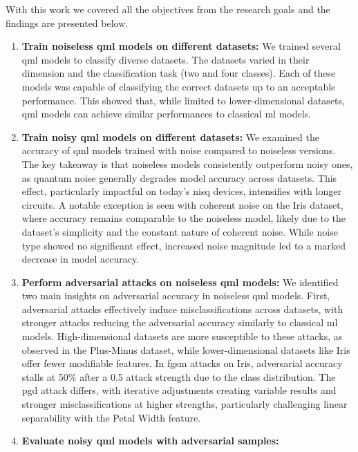 With this work we covered all the objectives from the research
goals and the findings are presented below. \

\begin{enumerate}
    \item \textbf{Train noiseless \ac{qml} models on different datasets:}
        We trained several \ac{qml} models to classify diverse datasets.
        The datasets varied in their dimension and the classification
        task (two and four classes). Each of these models was capable of
        classifying the correct datasets up to an acceptable performance.
        This showed that, while limited to lower-dimensional datasets,
        \ac{qml} models can achieve similar performances to classical
        \ac{ml} models. \
    \item \textbf{Train noisy \ac{qml} models on different datasets:}
        We examined the accuracy of \ac{qml} models trained
        with noise compared to noiseless versions. The key takeaway is
        that noiseless models consistently outperform noisy ones, as
        quantum noise generally degrades model accuracy across datasets.
        This effect, particularly impactful on today's \ac{nisq} devices,
        intensifies with longer circuits. A notable exception is seen with
        coherent noise on the Iris dataset, where accuracy remains comparable
        to the noiseless model, likely due to the dataset's simplicity and the
        constant nature of coherent noise. While noise type showed no significant
        effect, increased noise magnitude led to a marked decrease in model accuracy. \
    \item \textbf{Perform adversarial attacks on noiseless \ac{qml} models:}
        We identified two main insights on adversarial accuracy in noiseless
        \ac{qml} models. First, adversarial attacks effectively induce
        misclassifications across datasets, with stronger attacks reducing the
        adversarial accuracy similarly to classical \ac{ml} models. High-dimensional
        datasets are more susceptible to these attacks, as observed in the Plus-Minus
        dataset, while lower-dimensional datasets like Iris offer fewer modifiable
        features. In \ac{fgsm} attacks on Iris, adversarial accuracy stalls at 50\%
        after a 0.5 attack strength due to the class distribution. The \ac{pgd}
        attack differs, with iterative adjustments creating variable results
        and stronger misclassifications at higher strengths, particularly
        challenging linear separability with the Petal Width feature. \
    \item \textbf{Evaluate noisy \ac{qml} models with adversarial samples:}
\end{enumerate} \
